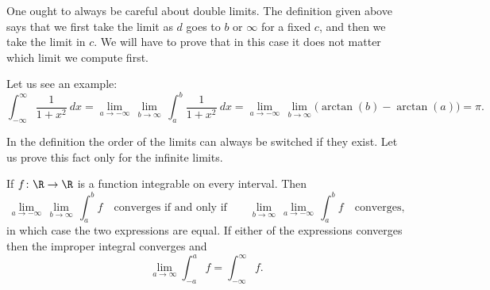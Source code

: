 \documentclass[12pt]{book}
\begin{document}
One ought to always be careful about double limits.
The definition
given above says that we first take the limit as $d$ goes to $b$ or
$\infty$ for a fixed $c$, and then we take the limit in $c$.
We will have to prove that in this case it does not matter which limit
we compute first.

\begin{example}
Let us see an example:
\begin{equation*}
\int_{-\infty}^\infty \frac{1}{1+x^2} ~ dx
=
\lim_{a \to -\infty} \, \lim_{b \to \infty} \,
\int_{a}^b \frac{1}{1+x^2} ~ dx
=
\lim_{a \to -\infty} \, \lim_{b \to \infty}
\bigl( \arctan(b) - \arctan(a) \bigr)
=
\pi .
\end{equation*}
\end{example}

In the definition the order of the limits can always be switched if they
exist.
Let us prove this fact only for the infinite limits.

\begin{prop}
If $f \colon \R \to \R$ is a function integrable on every interval.
Then 
\begin{equation*}
\lim_{a \to -\infty} \, \lim_{b \to \infty} \, \int_a^b f
\quad \text{converges if and only if} \qquad
\lim_{b \to \infty}
\,
\lim_{a \to -\infty}
\,
\int_a^b f
\quad
\text{converges,}
\end{equation*}
in which case the two
expressions are equal.
If either of the
expressions converges then the improper integral converges and
\begin{equation*}
\lim_{a\to\infty}
\int_{-a}^a f
=
\int_{-\infty}^\infty f .
\end{equation*}
\end{prop}
\end{document}
